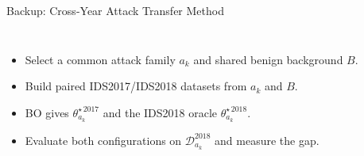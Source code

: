 \begin{frame}[noframenumbering]{Backup: Cross-Year Attack Transfer Method}
    \vspace{-0.35em}
    \begin{columns}[T,onlytextwidth]
        \scriptsize
        \begin{itemize}
            \setlength\itemsep{0.45em}
            \item<1-> Select a common attack family \(a_k\) and shared benign background \(B\).
            \item<2-> Build paired IDS2017/IDS2018 datasets from \(a_k\) and \(B\).
            \item<3-> BO gives \(\theta^{\star\,2017}_{a_k}\) and the IDS2018 oracle \(\theta^{\star\,2018}_{a_k}\).
            \item<4-> Evaluate both configurations on \(\mathcal{D}^{2018}_{a_k}\) and measure the gap.
        \end{itemize}

        \centering
        
    \end{columns}
\end{frame}

